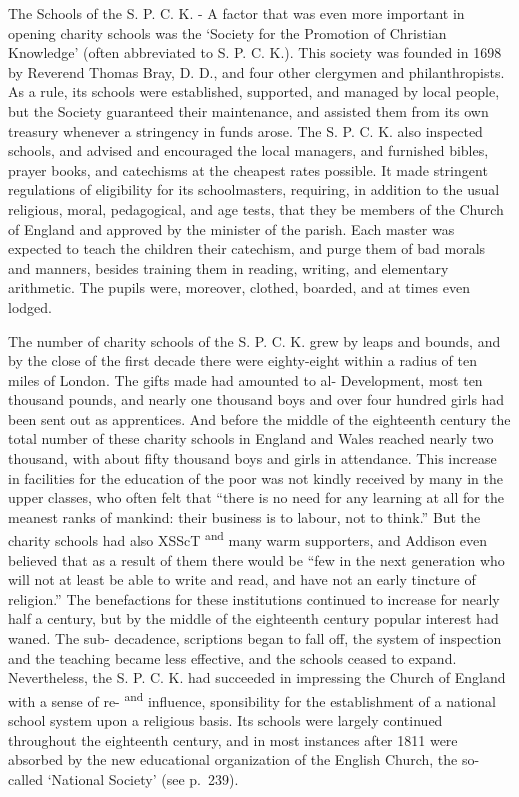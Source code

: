 \documentclass[]{book}
\begin{document}
The Schools of the S. P. C. K. - A factor that was even more important in opening charity schools was the `Society for the Promotion of Christian Knowledge' (often abbreviated to S. P. C. K.). This society was founded in 1698 by Reverend Thomas Bray, D. D., and four other clergymen and philanthropists. As a rule, its schools were established, supported, and managed by local people, but the Society guaranteed their maintenance, and assisted them from its own treasury whenever a stringency in funds arose. The S. P. C. K. also inspected schools, and advised and encouraged the local managers, and furnished bibles, prayer books, and catechisms at the cheapest rates possible. It made stringent regulations of eligibility for its schoolmasters, requiring, in addition to the usual religious, moral, pedagogical, and age tests, that they be members of the Church of England and approved by the minister of the parish. Each master was expected to teach the children their catechism, and purge them of bad morals and manners, besides training them in reading, writing, and elementary arithmetic. The pupils were, moreover, clothed, boarded, and at times even lodged.

The number of charity schools of the S. P. C. K. grew by leaps and bounds, and by the close of the first decade there were eighty-eight within a radius of ten\protect\hypertarget{ch20.xmlux5cux23para.292.1.0.box.129.228.1263.1556.q.60}{}{ miles of London. The gifts made had amounted to al- Development, most ten thousand pounds, and nearly one thousand boys and over four hundred girls had been sent out as apprentices. And before the middle of the eighteenth century the total number of these charity schools in England and Wales reached nearly two thousand, with about fifty thousand boys and girls in attendance. This increase in facilities for the education of the poor was not kindly received by many in the upper classes, who often felt that ``there is no need for any learning at all for the meanest ranks of mankind: their business is to labour, not to think.'' But the charity schools had also XSScT \textsuperscript{and} many warm supporters, and Addison even believed that as a result of them there would be ``few in the next generation who will not at least be able to write and read, and have not an early tincture of religion.'' The benefactions for these institutions continued to increase for nearly half a century, but by the middle of the eighteenth century popular interest had waned. The sub- decadence, scriptions began to fall off, the system of inspection and the teaching became less effective, and the schools ceased to expand. Nevertheless, the S. P. C. K. had succeeded in impressing the Church of England with a sense of re- \textsuperscript{and} influence, sponsibility for the establishment of a national school system upon a religious basis. Its schools were largely continued throughout the eighteenth century, and in most instances after 1811 were absorbed by the new educational organization of the English Church, the so-called `National Society' (see p.~239).}
\end{document}
